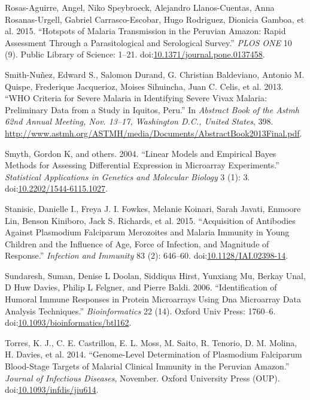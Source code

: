 \documentclass[a4paper]{article}
\begin{document}
\hypertarget{ref-hotspots2015}{}
Rosas-Aguirre, Angel, Niko Speybroeck, Alejandro Llanos-Cuentas, Anna
Rosanas-Urgell, Gabriel Carrasco-Escobar, Hugo Rodriguez, Dionicia
Gamboa, et al. 2015. ``Hotspots of Malaria Transmission in the Peruvian
Amazon: Rapid Assessment Through a Parasitological and Serological
Survey.'' \emph{PLOS ONE} 10 (9). Public Library of Science: 1--21.
doi:\href{https://doi.org/10.1371/journal.pone.0137458}{10.1371/journal.pone.0137458}.

\hypertarget{ref-smith2013}{}
Smith-Nuñez, Edward S., Salomon Durand, G. Christian Baldeviano, Antonio
M. Quispe, Frederique Jacquerioz, Moises Sihuincha, Juan C. Celis, et
al. 2013. ``WHO Criteria for Severe Malaria in Identifying Severe Vivax
Malaria: Preliminary Data from a Study in Iquitos, Peru.'' In
\emph{Abstract Book of the Astmh 62nd Annual Meeting, Nov. 13--17,
Washington D.C., United States}, 398.
\url{http://www.astmh.org/ASTMH/media/Documents/AbstractBook2013Final.pdf}.

\hypertarget{ref-smyth2004ebayes}{}
Smyth, Gordon K, and others. 2004. ``Linear Models and Empirical Bayes
Methods for Assessing Differential Expression in Microarray
Experiments.'' \emph{Statistical Applications in Genetics and Molecular
Biology} 3 (1): 3.
doi:\href{https://doi.org/10.2202/1544-6115.1027}{10.2202/1544-6115.1027}.

\hypertarget{ref-Stanisic2015}{}
Stanisic, Danielle I., Freya J. I. Fowkes, Melanie Koinari, Sarah
Javati, Enmoore Lin, Benson Kiniboro, Jack S. Richards, et al. 2015.
``Acquisition of Antibodies Against Plasmodium Falciparum Merozoites and
Malaria Immunity in Young Children and the Influence of Age, Force of
Infection, and Magnitude of Response.'' \emph{Infection and Immunity} 83
(2): 646--60.
doi:\href{https://doi.org/10.1128/IAI.02398-14}{10.1128/IAI.02398-14}.

\hypertarget{ref-sundaresh2006}{}
Sundaresh, Suman, Denise L Doolan, Siddiqua Hirst, Yunxiang Mu, Berkay
Unal, D Huw Davies, Philip L Felgner, and Pierre Baldi. 2006.
``Identification of Humoral Immune Responses in Protein Microarrays
Using Dna Microarray Data Analysis Techniques.'' \emph{Bioinformatics}
22 (14). Oxford Univ Press: 1760--6.
doi:\href{https://doi.org/10.1093/bioinformatics/btl162}{10.1093/bioinformatics/btl162}.

\hypertarget{ref-Torres2014asymptomatic}{}
Torres, K. J., C. E. Castrillon, E. L. Moss, M. Saito, R. Tenorio, D. M.
Molina, H. Davies, et al. 2014. ``Genome-Level Determination of
Plasmodium Falciparum Blood-Stage Targets of Malarial Clinical Immunity
in the Peruvian Amazon.'' \emph{Journal of Infectious Diseases},
November. Oxford University Press (OUP).
doi:\href{https://doi.org/10.1093/infdis/jiu614}{10.1093/infdis/jiu614}.
\end{document}
